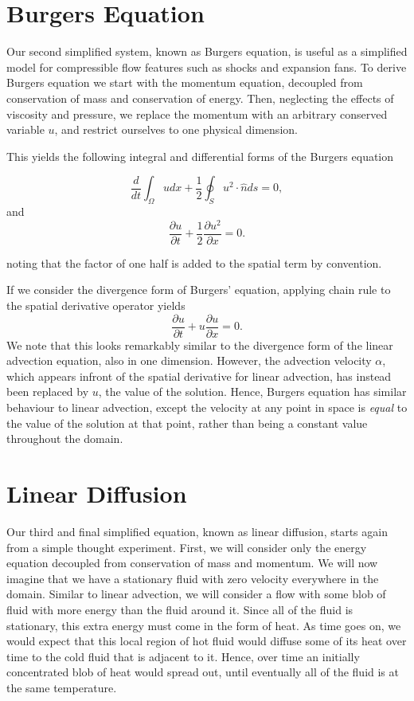 \section{Burgers Equation}
Our second simplified system, known as Burgers equation, is useful as a simplified model for compressible flow features such as shocks and expansion fans. To derive Burgers equation we start with the momentum equation, decoupled from conservation of mass and conservation of energy. Then, neglecting the effects of viscosity and pressure, we replace the momentum with an arbitrary conserved variable $u$, and restrict ourselves to one physical dimension. 

This yields the following integral and differential forms of the Burgers equation
\begin{eqBox}
\begin{equation}
	 \frac{d}{dt}\int_\Omega u dx + \frac{1}{2}\oint_S u^2 \cdot \hat{n} ds =  0,
\end{equation}
and
\begin{equation}
	\frac{\partial u}{\partial t} +  \frac{1}{2} \frac{\partial u^2}{\partial x} = 0.
\end{equation}
\end{eqBox}
noting that the factor of one half is added to the spatial term by convention.

If we consider the divergence form of Burgers' equation, applying chain rule to the spatial derivative operator yields
\begin{equation}
	\frac{\partial u}{\partial t} +  u \frac{\partial u}{\partial x} = 0.
\end{equation}
We note that this looks remarkably similar to the divergence form of the linear advection equation, also in one dimension. However, the advection velocity $\alpha$, which appears infront of the spatial derivative for linear advection, has instead been replaced by $u$, the value of the solution. Hence, Burgers equation has similar behaviour to linear advection, except the velocity at any point in space is {\it equal} to the value of the solution at that point, rather than being a constant value throughout the domain.

\section{Linear Diffusion}
Our third and final simplified equation, known as linear diffusion, starts again from a simple thought experiment. First, we will consider only the energy equation decoupled from conservation of mass and momentum. We will now imagine that we have a stationary fluid with zero velocity everywhere in the domain. Similar to linear advection, we will consider a flow with some blob of fluid with more energy than the fluid around it. Since all of the fluid is stationary, this extra energy must come in the form of heat. As time goes on, we would expect that this local region of hot fluid would diffuse some of its heat over time to the cold fluid that is adjacent to it. Hence, over time an initially concentrated blob of heat would spread out, until eventually all of the fluid is at the same temperature.

